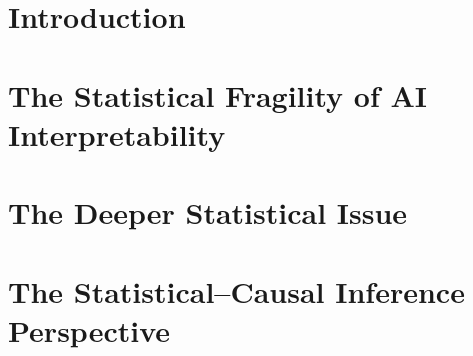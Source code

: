 \documentclass{article} %
\begin{document}
\begin{abstract}
\end{abstract}


\section{Introduction}
\label{sec:introduction}


\section{The Statistical Fragility of AI Interpretability}
\label{sec:description}


% 

\section{The Deeper Statistical Issue}
\label{sec:issue}


\section{The Statistical--Causal Inference Perspective}
\label{sec:stats_inf_view}

\end{document}
